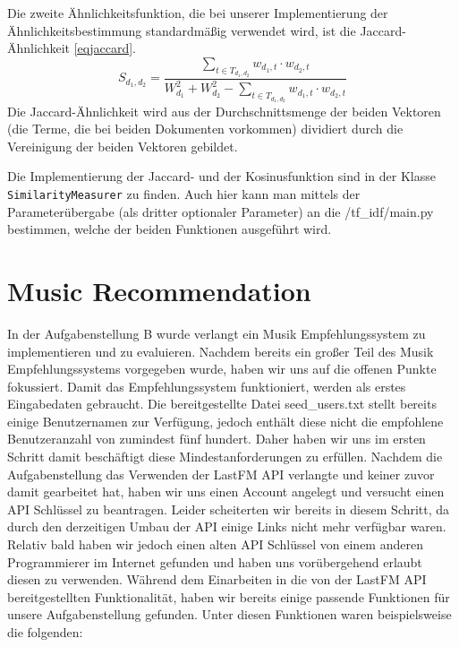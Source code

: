 \documentclass[prodmode,acmtecs]{acmsmall} %
\begin{document}
Die zweite Ähnlichkeitsfunktion, die bei unserer Implementierung der Ähnlichkeitsbestimmung standardmäßig verwendet wird, ist die Jaccard-Ähnlichkeit \eqref{eqjaccard}. 
\begin{equation}\label{eqjaccard}
  S_{d_1, d_2} = \frac{\sum_{t \in T_{d_1, d_2}}{w_{d_1, t} \cdot w_{d_2, t}}}{W_{d_1}^2 + W_{d_2}^2 - \sum_{t \in T_{d_1, d_2}}{w_{d_1, t} \cdot w_{d_2, t}}}
\end{equation}
Die Jaccard-Ähnlichkeit wird aus der Durchschnittsmenge der beiden Vektoren (die Terme, die bei beiden Dokumenten vorkommen) dividiert durch die Vereinigung der beiden Vektoren gebildet.

Die Implementierung der Jaccard- und der Kosinusfunktion sind in der Klasse \texttt{SimilarityMeasurer} zu finden. Auch hier kann man mittels der Parameterübergabe (als dritter optionaler Parameter) an die /tf\_idf/main.py bestimmen, welche der beiden Funktionen ausgeführt wird.

\section{Music Recommendation}
In der Aufgabenstellung B wurde verlangt ein Musik Empfehlungssystem zu implementieren und zu evaluieren. Nachdem bereits ein großer Teil des Musik Empfehlungssystems vorgegeben wurde, haben wir uns auf die offenen Punkte fokussiert. Damit das Empfehlungssystem funktioniert, werden als erstes Eingabedaten gebraucht. Die bereitgestellte Datei seed\_users.txt stellt bereits einige Benutzernamen zur Verfügung, jedoch enthält diese nicht die empfohlene Benutzeranzahl von zumindest fünf hundert. Daher haben wir uns im ersten Schritt damit beschäftigt diese Mindestanforderungen zu erfüllen. Nachdem die Aufgabenstellung das Verwenden der LastFM API verlangte und keiner zuvor damit gearbeitet hat, haben wir uns einen Account angelegt und versucht einen API Schlüssel zu beantragen. Leider scheiterten wir bereits in diesem Schritt, da durch den derzeitigen Umbau der API einige Links nicht mehr verfügbar waren. Relativ bald haben wir jedoch einen alten API Schlüssel von einem anderen Programmierer im Internet gefunden und haben uns vorübergehend erlaubt diesen zu verwenden. Während dem Einarbeiten in die von der LastFM API bereitgestellten Funktionalität, haben wir bereits einige passende Funktionen für unsere Aufgabenstellung gefunden. Unter diesen Funktionen waren beispielsweise die folgenden:
\end{document}
